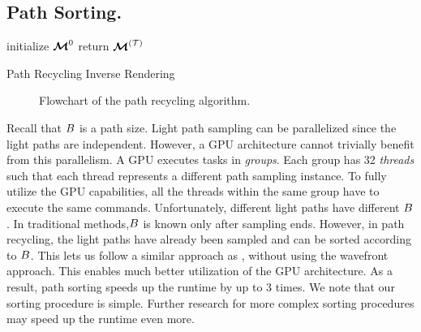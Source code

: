 \documentclass{article}
\begin{document}
\subsection{Path Sorting.}
\begin{algorithm}[t]
\DontPrintSemicolon
\SetAlgoLined
 initialize $\boldsymbol{\mathcal{M}}^{0}$\;
return $\boldsymbol{\mathcal{M}}^{\left({\mathcal{T}}\right)}$
 \caption{Path Recycling Inverse Rendering}
 \label{alg:inverse_recycling}
\end{algorithm}

\begin{figure}[t]
\centering

\caption{Flowchart of the path recycling algorithm.}
\label{fig:path_recycling_diagram}
\end{figure}


Recall that $B$ is a path size. Light path sampling can be parallelized since the light paths are independent. However, a \ac{GPU} architecture cannot trivially benefit from this parallelism. A \ac{GPU} executes tasks in {\em groups}. Each group has 32 {\em threads} such that each thread represents a different path sampling instance. To fully utilize the \ac{GPU} capabilities, all the threads within the same group have to execute the same commands. Unfortunately, different light paths have different $B$. In traditional methods,$B$ is known only after sampling ends. However, in path recycling, the light paths have already been sampled and can be sorted according to $B$. This lets us follow a similar approach as \citep{afra2016local}, without using the wavefront approach. This enables much better utilization of the \ac{GPU} architecture. As a result, path sorting speeds up the runtime by up to 3 times. We note that our sorting procedure is simple. Further research for more complex sorting procedures may speed up the runtime even more. 
\end{document}
